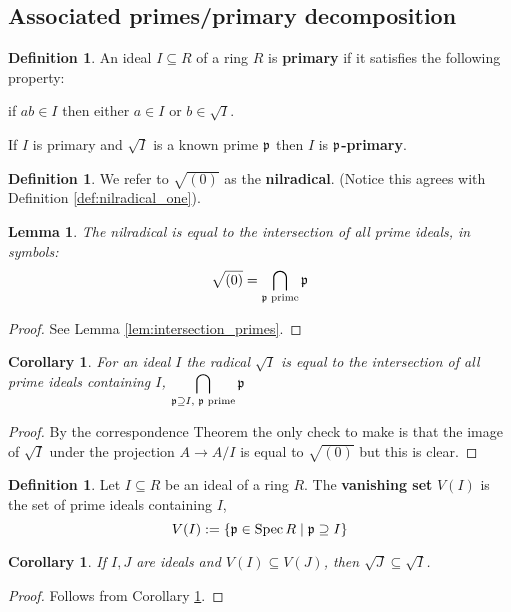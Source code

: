 \documentclass[12pt]{article}
\theoremstyle{plain}
\newtheorem{lemma}[thm]{Lemma}
\newtheorem{cor}[thm]{Corollary}
\theoremstyle{definition}
\newtheorem{defn}[thm]{Definition} %
\newcommand{\lto}{\longrightarrow}
\begin{document}
	\subsection{Associated primes/primary decomposition}
	\begin{defn}
		\label{def:p-primary}
		An ideal $I \subseteq R$ of a ring $R$ is \textbf{primary} if it satisfies the following property:
		
		if $ab \in I$ then either $a \in I$ or $b \in \sqrt{I}$.
		
		If $I$ is primary and $\sqrt{I}$ is a known prime $\frak{p}$ then $I$ is \textbf{$\frak{p}$-primary}.
	\end{defn}
	\begin{defn}
		We refer to $\sqrt{(0)}$ as the \textbf{nilradical}. (Notice this agrees with Definition \ref{def:nilradical_one}).
	\end{defn}
	\begin{lemma}
		The nilradical is equal to the intersection of all prime ideals, in symbols:
		\[\sqrt{(0)} = \bigcap_{\frak{p}\text{ prime}}\frak{p}\]
	\end{lemma}
	\begin{proof}
		See Lemma \ref{lem:intersection_primes}.
	\end{proof}
	\begin{cor}
		\label{cor:intersection_primes}
		For an ideal $I$ the radical $\sqrt{I}$ is equal to the intersection of all prime ideals containing $I$, $\displaystyle\bigcap_{\frak{p} \supseteq I\text{, }\frak{p}\text{ prime}}\frak{p}$
	\end{cor}
	\begin{proof}
		By the correspondence Theorem the only check to make is that the image of $\sqrt{I}$ under the projection $A \lto A/I$ is equal to $\sqrt{(0)}$ but this is clear.
	\end{proof}
	\begin{defn}
		\label{def:vanishing} Let $I \subseteq R$ be an ideal of a ring $R$. The \textbf{vanishing set} $V(I)$ is the set of prime ideals containing $I$,
		\[V(I) := \lbrace \frak{p} \in \operatorname{Spec}R \mid \frak{p} \supseteq I\rbrace\]
	\end{defn}
	\begin{cor}
		\label{cor:vanishing_subset}
		If $I,J$ are ideals and $V(I) \subseteq V(J)$, then $\sqrt{J} \subseteq \sqrt{I}$.
	\end{cor}
	\begin{proof}
		Follows from Corollary \ref{cor:intersection_primes}.
	\end{proof}
\end{document}

